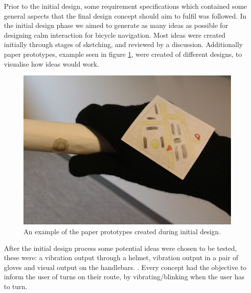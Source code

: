 \documentclass{sigchi}
\begin{document}
\newline
\newline
Prior to the initial design, some requirement specifications which contained some general aspects that the final design concept should aim to fulfil was followed. In the initial design phase we aimed to generate as many ideas as possible for designing calm interaction for bicycle navigation. Most ideas were created initially through stages of sketching, and reviewed by a discussion. Additionally paper prototypes, example seen in figure \ref{fig:handle-button}, were created of different designs, to visualise how ideas would work.
\begin{figure}
\centering
  \includegraphics[width=0.8\columnwidth]{figures/handle-button.jpg}
  \caption{An example of the paper prototypes created during initial design.}\label{fig:handle-button}
\end{figure}
After the initial design process some potential ideas were chosen to be tested, these were: a vibration output through a helmet, vibration output in a pair of gloves and visual output on the handlebars. . Every concept had the objective to inform the user of turns on their route, by vibrating/blinking when the user has to turn.
\end{document}
